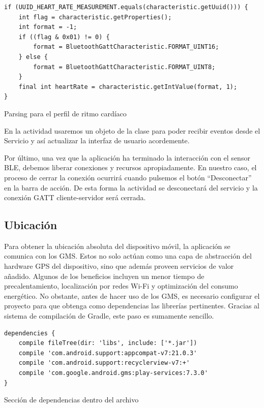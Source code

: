 \begin{listing}[h] 
\begin{verbatim}
if (UUID_HEART_RATE_MEASUREMENT.equals(characteristic.getUuid())) {
    int flag = characteristic.getProperties();
    int format = -1;
    if ((flag & 0x01) != 0) {
        format = BluetoothGattCharacteristic.FORMAT_UINT16;
    } else {
        format = BluetoothGattCharacteristic.FORMAT_UINT8;
    }
    final int heartRate = characteristic.getIntValue(format, 1);
} 
\end{verbatim}
\caption{Parsing para el perfil de ritmo cardíaco}
\label{code:bleParsing}
\end{listing}

En la actividad  usaremos un objeto de la clase  para poder recibir eventos desde el Servicio y así actualizar la interfaz de usuario acordemente.

Por último, una vez que la aplicación ha terminado la interacción con el sensor BLE, debemos liberar conexiones y recursos apropiadamente. En nuestro caso, el proceso de cerrar la conexión ocurrirá cuando pulsemos el botón ``Desconectar'' en la barra de acción. De esta forma la actividad  se desconectará del servicio y la conexión GATT cliente-servidor será cerrada.

\subsection{Ubicación}

Para obtener la ubicación absoluta del dispositivo móvil, la aplicación se comunica con los \ac{GMS}. Estos no solo actúan como una capa de abstracción del hardware \ac{GPS} del dispositivo, sino que además proveen servicios de valor añadido. Algunos de los beneficios incluyen un menor tiempo de precalentamiento, localización por redes Wi-Fi y optimización del consumo energético.
No obstante, antes de hacer uso de los GMS, es necesario configurar el proyecto para que obtenga como dependencias las librerías pertinentes. Gracias al sistema de compilación de Gradle, este paso es sumamente sencillo.


\begin{listing}[h] 
\begin{verbatim}
dependencies {
    compile fileTree(dir: 'libs', include: ['*.jar'])
    compile 'com.android.support:appcompat-v7:21.0.3'
    compile 'com.android.support:recyclerview-v7:+'
    compile 'com.google.android.gms:play-services:7.3.0'
}
\end{verbatim}
\caption{Sección de dependencias dentro del archivo }
\label{code:buildeps}
\end{listing}

